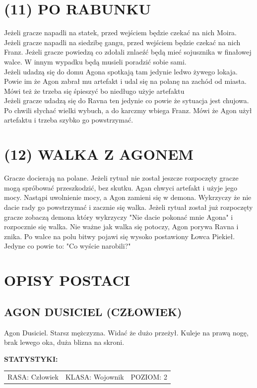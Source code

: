 \documentclass[14pt]{article}
\begin{document}
\section*{(11) PO RABUNKU}
\RaggedRight
Jeżeli gracze napadli na statek, przed wejściem będzie czekać na nich Moira. Jeżeli gracze napadli na siedzibę gangu, przed wejściem będzie czekać na nich Franz. Jeżeli gracze powiedzą co zdołali znlaeźć będą mieć sojusznika w finałowej walce. W innym wypadku będą musieli poradzić sobie sami. \\
Jeżeli udadzą się do domu Agona spotkają tam jedynie ledwo żywego lokaja. Powie im że Agon zabrał mu artefakt i udal się na polanę na zachód od miasta. Mówi też że trzeba się śpieszyć bo niedługo użyje artefaktu\\
Jeżeli gracze udadzą się do Ravna ten jedynie co powie że sytuacja jest chujowa. Po chwili słychać wielki wybuch, a do karczmy wbiega Franz. Mówi że Agon użył artefaktu i trzeba szybko go powstrzymać.

\Centering
\section*{(12) WALKA Z AGONEM}
\RaggedRight
Gracze docierają na polane. Jeżeli rytuał nie został jeszcze rozpoczęty gracze mogą spróbować przeszkodzić, bez skutku. Agan chwyci artefakt i użyje jego mocy. Nastąpi uwolnienie mocy, a Agon zamieni się w demona. Wykrzyczy że nie dacie rady go powstrzymać i zacznie się walka. Jeżeli rytuał został już rozpoczęty gracze zobaczą demona który wykrzyczy "Nie dacie pokonać mnie Agona" i rozpocznie się walka. Nie ważne jak walka się potoczy, Agon porywa Ravna i znika. Po walce na polu bitwy pojawi się wysoko postawiony Łowca Piekieł. Jedyne co powie to: "Co wyście narobili?"

\newpage
\Centering
\section*{OPISY POSTACI}
\subsection*{AGON DUSICIEL (CZŁOWIEK)}
Agon Dusiciel. Starsz mężczyzna. Widać że dużo przeżył. Kuleje na prawą nogę, brak lewego oka, duża blizna na skroni.\\
\vspace{5mm}

\textbf{STATYSTYKI:} \\
\vspace{2mm}
\begin{tabularx}{\textwidth}{Y|Y|Y}
    \hline
    RASA: Człowiek & KLASA: Wojownik & POZIOM: 2 \\
\end{tabularx}
\end{document}
